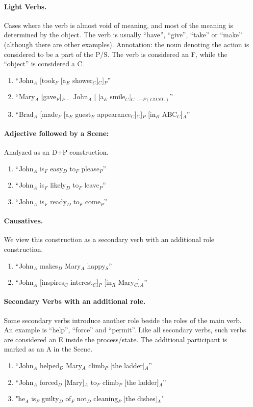 \documentclass[11pt]{article}
\newcommand{\be}{\begin{enumerate}}
\newcommand{\ee}{\end{enumerate}}
\begin{document}
\paragraph{Light Verbs.} Cases where the verb is almost void of meaning, and most of the meaning is determined by the object. The verb is usually ``have'', ``give'', ``take'' or ``make'' (although there are other examples). Annotation: the noun denoting the action is considered to be a part of the P/S. The verb is considered an F, while the ``object'' is considered a C.
\be \item
``John$_A$ [took$_F$ [a$_E$ shower$_C$]$_C$]$_P$''
\item
``Mary$_A$ [gave$_F$]$_{P-}$ John$_A$ [ [a$_E$ smile$_C$]$_C$ ]$_{-P(CONT.)}$''
\item
``Brad$_A$ [made$_F$ [a$_E$ guest$_E$ appearance$_C$]$_C$]$_P$ [in$_R$ ABC$_C$]$_A$''
\ee

\paragraph{Adjective followed by a Scene:} Analyzed as an D+P construction.
\be \item
``John$_A$ is$_F$ easy$_D$ to$_F$ please$_P$''
\item
``John$_A$ is$_F$ likely$_D$ to$_F$ leave$_P$''
\item
``John$_A$ is$_F$ ready$_D$ to$_F$ come$_P$''
\ee

\paragraph{Causatives.} We view this construction as a secondary verb with an additional role construction.
\be \item
``John$_A$ makes$_D$ Mary$_A$ happy$_S$''
\item
``John$_A$ [inspires$_C$ interest$_C$]$_P$ [in$_R$ Mary$_C$]$_A$''
\ee

\paragraph{Secondary Verbs with an additional role.}
Some secondary verbs introduce another role beside the roles of the main verb. An example is ``help'', ``force'' and ``permit''. Like all secondary verbs, such verbs are considered an E inside the process/state. The additional participant is marked as an A in the Scene.
\be \item
``John$_A$ helped$_D$ Mary$_A$ climb$_P$ [the ladder]$_A$''
\item
``John$_A$ forced$_D$ [Mary]$_A$ to$_F$ climb$_P$ [the ladder]$_A$''
\item
"he$_A$ is$_F$ guilty$_D$ of$_F$ not$_D$ cleaning$_P$ [the dishes]$_A$"
\ee
\end{document}
